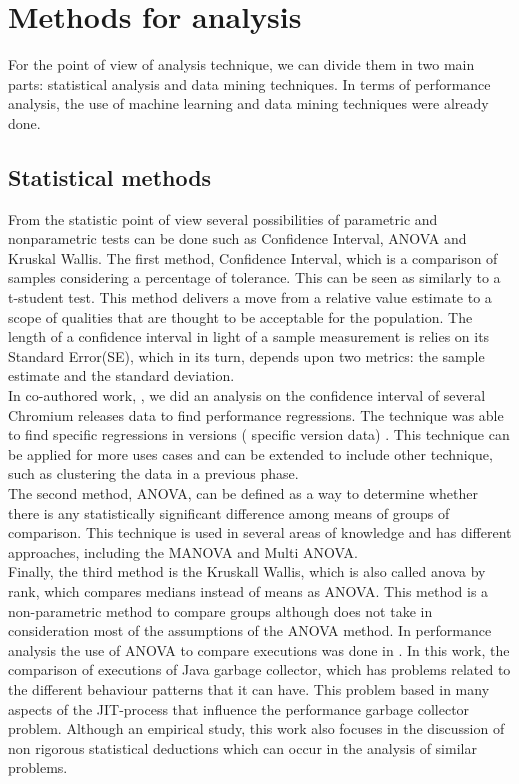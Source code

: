 \section{Methods for analysis}
For the point of view of analysis technique, we can divide them in two main parts: statistical analysis and data mining techniques. In terms of performance analysis, the use of machine learning and data mining techniques were already done.\\
\subsection{Statistical methods}
From the statistic point of view several possibilities of parametric and nonparametric tests can be done such as Confidence Interval, ANOVA and Kruskal Wallis.
The first method, Confidence Interval, which is a comparison of samples considering a percentage of tolerance. This can be seen as similarly to a t-student test.  This method delivers a move from a  relative value estimate to a scope of qualities that are thought to be acceptable for the population. The length of a confidence interval in light of a sample measurement is relies on its Standard Error(SE), which in its turn, depends upon two metrics: the sample estimate and the standard deviation.\\
In co-authored work, \cite{google_releases}, we did an analysis on the confidence interval of several Chromium releases data to find performance regressions. The technique was able to find specific regressions in versions ( specific version data) . This technique can be applied for more uses cases and can be extended to include other technique, such as clustering the data in a previous phase.\\
The second method, ANOVA, can be defined as a way to determine whether there is any statistically significant difference among means of groups of comparison. This technique is used in several areas of knowledge and has different approaches, including the MANOVA and Multi ANOVA.\\
Finally, the third method is the Kruskall Wallis, which is also called anova by rank, which compares medians instead of means as ANOVA. This method is a non-parametric method to compare groups although does not take in consideration most of the assumptions of the ANOVA method.
In performance analysis the use of ANOVA to compare executions was done in \cite{rigorous_statistical}. In this work, the comparison of executions of Java garbage collector, which has problems related to the different behaviour patterns that it can have. This problem based in many aspects of the JIT-process that influence the performance garbage collector problem. Although an empirical study, this work also focuses in the discussion of non rigorous statistical deductions which can occur in the analysis of similar problems. \\
